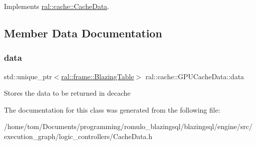 Implements \hyperlink{classral_1_1cache_1_1CacheData_aaad8a726296574845f01f9380dcee40d}{ral\+::cache\+::\+Cache\+Data}.



\subsection{Member Data Documentation}
\mbox{\label{classral_1_1cache_1_1GPUCacheData_a2a960bdb89bb40964a9c317f1b06fd8c}} 
\subsubsection{\texorpdfstring{data}{data}}
{\footnotesize\ttfamily std\+::unique\+\_\+ptr$<$\hyperlink{classral_1_1frame_1_1BlazingTable}{ral\+::frame\+::\+Blazing\+Table}$>$ ral\+::cache\+::\+G\+P\+U\+Cache\+Data\+::data\hspace{0.3cm}{\ttfamily [protected]}}

Stores the data to be returned in decache 

The documentation for this class was generated from the following file\+:\begin{DoxyCompactItemize}
\item 
/home/tom/\+Documents/programming/romulo\+\_\+blazingsql/blazingsql/engine/src/execution\+\_\+graph/logic\+\_\+controllers/Cache\+Data.\+h\end{DoxyCompactItemize}

